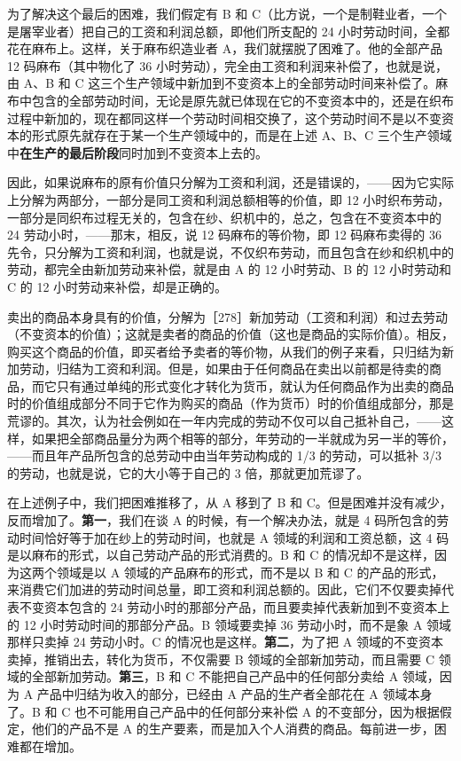 为了解决这个最后的困难，我们假定有 B 和 C（比方说，一个是制鞋业者，一个是屠宰业者）把自己的工资和利润总额，即他们所支配的 24 小时劳动时间，全都花在麻布上。这样，关于麻布织造业者 A，我们就摆脱了困难了。他的全部产品 12 码麻布（其中物化了 36 小时劳动），完全由工资和利润来补偿了，也就是说，由 A、B 和 C 这三个生产领域中新加到不变资本上的全部劳动时间来补偿了。麻布中包含的全部劳动时间，无论是原先就已体现在它的不变资本中的，还是在织布过程中新加的，现在都同这样一个劳动时间相交换了，这个劳动时间不是以不变资本的形式原先就存在于某一个生产领域中的，而是在上述 A、B、C 三个生产领域中\textbf{在生产的最后阶段}同时加到不变资本上去的。

因此，如果说麻布的原有价值只分解为工资和利润，还是错误的，——因为它实际上分解为两部分，一部分是同工资和利润总额相等的价值，即 12 小时织布劳动，一部分是同织布过程无关的，包含在纱、织机中的，总之，包含在不变资本中的 24 劳动小时，——那末，相反，说 12 码麻布的等价物，即 12 码麻布卖得的 36 先令，只分解为工资和利润，也就是说，不仅织布劳动，而且包含在纱和织机中的劳动，都完全由新加劳动来补偿，就是由 A 的 12 小时劳动、B 的 12 小时劳动和 C 的 12 小时劳动来补偿，却是正确的。

卖出的商品本身具有的价值，分解为［278］新加劳动（工资和利润）和过去劳动（不变资本的价值）；这就是卖者的商品的价值（这也是商品的实际价值）。相反，购买这个商品的价值，即买者给予卖者的等价物，从我们的例子来看，只归结为新加劳动，归结为工资和利润。但是，如果由于任何商品在卖出以前都是待卖的商品，而它只有通过单纯的形式变化才转化为货币，就认为任何商品作为出卖的商品时的价值组成部分不同于它作为购买的商品（作为货币）时的价值组成部分，那是荒谬的。其次，认为社会例如在一年内完成的劳动不仅可以自己抵补自己，——这样，如果把全部商品量分为两个相等的部分，年劳动的一半就成为另一半的等价，——而且年产品所包含的总劳动中由当年劳动构成的 1/3 的劳动，可以抵补 3/3 的劳动，也就是说，它的大小等于自己的 3 倍，那就更加荒谬了。

在上述例子中，我们把困难推移了，从 A 移到了 B 和 C。但是困难并没有减少，反而增加了。\textbf{第一}，我们在谈 A 的时候，有一个解决办法，就是 4 码所包含的劳动时间恰好等于加在纱上的劳动时间，也就是 A 领域的利润和工资总额，这 4 码是以麻布的形式，以自己劳动产品的形式消费的。B 和 C 的情况却不是这样，因为这两个领域是以 A 领域的产品麻布的形式，而不是以 B 和 C 的产品的形式，来消费它们加进的劳动时间总量，即工资和利润总额的。因此，它们不仅要卖掉代表不变资本包含的 24 劳动小时的那部分产品，而且要卖掉代表新加到不变资本上的 12 小时劳动时间的那部分产品。B 领域要卖掉 36 劳动小时，而不是象 A 领域那样只卖掉 24 劳动小时。C 的情况也是这样。\textbf{第二}，为了把 A 领域的不变资本卖掉，推销出去，转化为货币，不仅需要 B 领域的全部新加劳动，而且需要 C 领域的全部新加劳动。\textbf{第三}，B 和 C 不能把自己产品中的任何部分卖给 A 领域，因为 A 产品中归结为收入的部分，已经由 A 产品的生产者全部花在 A 领域本身了。B 和 C 也不可能用自己产品中的任何部分来补偿 A 的不变部分，因为根据假定，他们的产品不是 A 的生产要素，而是加入个人消费的商品。每前进一步，困难都在增加。

